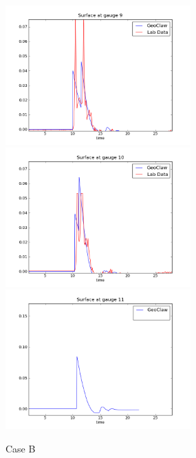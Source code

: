 \begin{figure}[ht]
\hfil\includegraphics[width=2.8in]{bp5/CaseB/gauge0009fig300.png}\hfil
\vskip 5pt
\hfil\includegraphics[width=2.8in]{bp5/CaseB/gauge0010fig300.png}\hfil
\hfil\includegraphics[width=2.8in]{bp5/CaseB/gauge0011fig300.png}\hfil
\caption{\label{fig:bp2B} Case B }
\end{figure}

